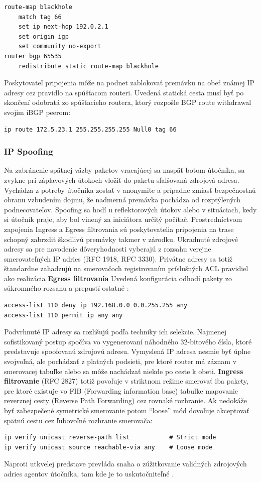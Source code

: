 \documentclass[12pt, a4paper]{article}
\begin{document}
\begin{lstlisting}
route-map blackhole
    match tag 66
    set ip next-hop 192.0.2.1
    set origin igp
    set community no-export
router bgp 65535
    redistribute static route-map blackhole
\end{lstlisting}
Poskytovateľ pripojenia môže na podnet zablokovať premávku na obeť známej IP adresy
cez pravidlo na spúšťacom routeri. Uvedená statická cesta musí byť po skončení odobratá zo spúšťacieho 
routera, ktorý rozpošle BGP route withdrawal svojim iBGP peerom:
\begin{lstlisting}
ip route 172.5.23.1 255.255.255.255 Null0 tag 66
\end{lstlisting}

\subsubsection{IP Spoofing}
Na zabránenie spätnej väzby paketov vracajúcej sa naspäť botom útočníka, sa zvykne pri záplavových útokoch 
vložiť do paketu sfalšovaná zdrojová adresa. Vychádza z potreby útočníka zostať v anonymite a prípadne 
zmiasť bezpečnostnú obranu vzbudením dojmu, že nadmerná premávka pochádza od rozptýlených podnecovateľov. 
Spoofing sa hodí u reflektorových útokov alebo v situáciach, kedy si útočník praje, aby bol vinený za 
iniciátora určitý počítač. Prostredníctvom zapojenia Ingress a Egress filtrovania sú poskytovatelia 
pripojenia na trase schopný zabrzdiť škodlivú premávky takmer v zárodku. Ukradnuté zdrojové adresy sa 
pre navodenie dôveryhodnosti vyberajú z rozsahu verejne smerovateľných IP adries (RFC 1918, RFC 3330). 
Privátne adresy sa totiž  štandardne zahadzujú na smerovačoch registrovaním príslušných ACL pravidiel ako 
realizácia \textbf{Egress filtrovania} Uvedená konfigurácia odhodí pakety zo súkromného rozsahu a 
prepustí ostatné \cite{cisco-spoofing-rules}: 
\begin{lstlisting}
access-list 110 deny ip 192.168.0.0 0.0.255.255 any
access-list 110 permit ip any any
\end{lstlisting}

Podvrhnuté IP adresy sa rozlišujú podľa techniky ich selekcie. Najmenej sofistikovaný postup spočíva vo 
vygenerovaní náhodného 32-bitového čísla, ktoré predstavuje spoofovanú zdrojovú adresu. 
Vymyslená IP adresa nesmie byť úplne svojvoľná, ale pochádzať z platných podsieti, pre ktoré router má 
záznam v smerovacej tabuľke alebo sa môže nachádzať niekde po ceste k obeti. \textbf{Ingress filtrovanie}
(RFC 2827) totiž povoľuje v striktnom režime smerovať iba pakety, pre ktoré existuje vo FIB (Forwarding 
information base) tabuľke mapovanie reverznej cesty (Reverse Path Forwarding) cez rovnaké rozhranie. Ak 
nedokáže byť zabezpečené symetrické  smerovanie potom \enquote{loose} mód dovoľuje akceptovať spätnú cestu 
cez ľubovoľné rozhranie smerovača:
\begin{lstlisting}
ip verify unicast reverse-path list           # Strict mode
ip verify unicast source reachable-via any    # Loose mode
\end{lstlisting}
Naproti utkvelej predstave prevláda snaha o zúžitkovanie validných zdrojových adries agentov útočníka,
tam kde je to uskutočniteľné \cite{ddos-anatomy-2004}.
\end{document}
